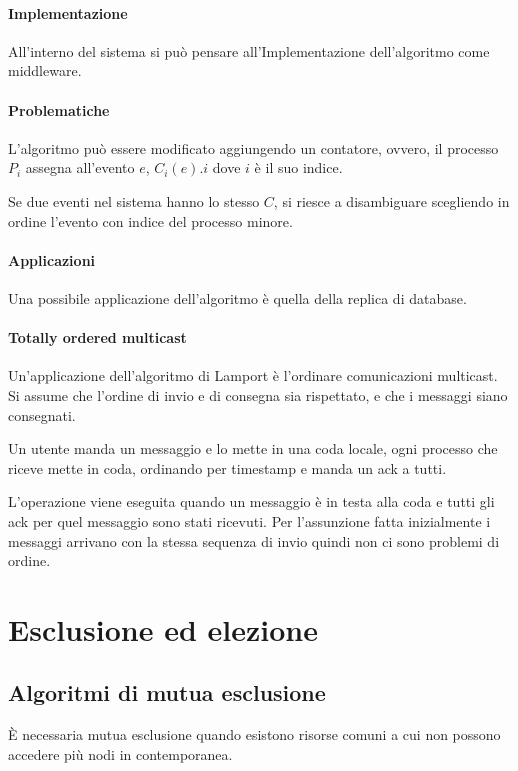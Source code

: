 \paragraph{Implementazione}
All'interno del sistema si può pensare all'Implementazione
dell'algoritmo come middleware.

\paragraph{Problematiche}
L'algoritmo può essere modificato aggiungendo un contatore, 
ovvero, il processo $P_i$ assegna all'evento 
$e$, $C_i(e).i$ dove $i$ è il suo indice.

Se due eventi nel sistema hanno lo stesso $C$, si riesce 
a disambiguare scegliendo in ordine l'evento con indice 
del processo minore.

\paragraph{Applicazioni}
Una possibile applicazione dell'algoritmo è quella 
della replica di database.

\paragraph{Totally ordered multicast}
Un'applicazione dell'algoritmo di Lamport è l'ordinare comunicazioni multicast.
Si assume che l'ordine di invio e di consegna sia rispettato, e che i messaggi 
siano consegnati.

Un utente manda un messaggio e lo mette in una coda locale, ogni 
processo che riceve mette in coda, ordinando per timestamp e manda un ack a tutti. 

L'operazione viene eseguita quando un messaggio è in testa alla coda 
e tutti gli ack per quel messaggio sono stati ricevuti. Per l'assunzione fatta inizialmente 
i messaggi arrivano con la stessa sequenza di invio quindi non ci sono problemi di ordine.

\section{Esclusione ed elezione}
\subsection{Algoritmi di mutua esclusione}
\label{mutua}
È necessaria mutua esclusione quando esistono risorse 
comuni a cui non possono accedere più nodi in contemporanea.

